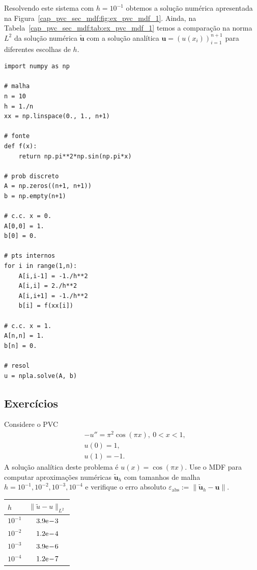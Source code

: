 \begin{ex}
Resolvendo este sistema com $h=10^{-1}$ obtemos a solução numérica apresentada na Figura~\ref{cap_pvc_sec_mdf:fig:ex_pvc_mdf_1}. Ainda, na Tabela~\ref{cap_pvc_sec_mdf:tab:ex_pvc_mdf_1} temos a comparação na norma $L^2$ da solução numérica $\tilde{\pmb{u}}$ com a solução analítica $\pmb{u} = (u(x_i))_{i=1}^{n+1}$ para diferentes escolhas de $h$.

\begin{lstlisting}[caption=pvc\_mdf.py]
import numpy as np

# malha
n = 10
h = 1./n
xx = np.linspace(0., 1., n+1)

# fonte
def f(x):
    return np.pi**2*np.sin(np.pi*x)

# prob discreto
A = np.zeros((n+1, n+1))
b = np.empty(n+1)

# c.c. x = 0.
A[0,0] = 1.
b[0] = 0.

# pts internos
for i in range(1,n):
    A[i,i-1] = -1./h**2
    A[i,i] = 2./h**2
    A[i,i+1] = -1./h**2
    b[i] = f(xx[i])

# c.c. x = 1.
A[n,n] = 1.
b[n] = 0.

# resol
u = npla.solve(A, b)
\end{lstlisting}
\end{ex}

\subsection*{Exercícios}

\begin{exer}
  Considere o PVC
  \begin{align}
    &-u'' = \pi^2\cos(\pi x), ~0 < x < 1,\\
    &u(0) = 1,\\
    &u(1) = -1.
  \end{align}
  A solução analítica deste problema é $u(x) = \cos(\pi x)$. Use o MDF para computar aproximações numéricas $\tilde{\pmb{u}}_h$ com tamanhos de malha $h=10^{-1}, 10^{-2}, 10^{-3}, 10^{-4}$ e verifique o erro absoluto $\varepsilon_{\text{abs}} := \|\tilde{\pmb{u}}_h - \pmb{u}\|$.
\end{exer}
\begin{resp}
  \begin{tabular}{l|c}\toprule
    $h$ & $\|\tilde{u} - u\|_{L^2}$ \\\midrule
    $10^{-1}$ & $3.9\mathrm{e}\!-\!3$\\
    $10^{-2}$ & $1.2\mathrm{e}\!-\!4$\\
    $10^{-3}$ & $3.9\mathrm{e}\!-\!6$\\
    $10^{-4}$ & $1.2\mathrm{e}\!-\!7$\\\bottomrule
  \end{tabular}  
\end{resp}

